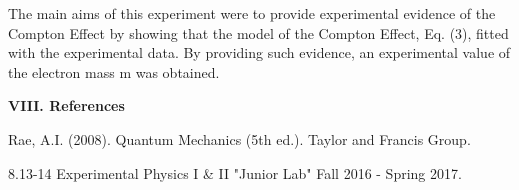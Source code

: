 \documentclass[fleqn]{article}
\begin{document}
  \vspace{10px}

  The main aims of this experiment were to provide experimental evidence of the Compton Effect by showing that the model of the Compton Effect,
  Eq. (3), fitted with the experimental data. By providing such evidence, an experimental value of the electron mass m was obtained.

  \pagebreak

  \textbf{VIII. References}

  \vspace{15px}

  Rae, A.I. (2008). Quantum Mechanics (5th ed.). Taylor and Francis Group.

  \vspace{5px}

  8.13-14 Experimental Physics I \& II "Junior Lab" Fall 2016 - Spring 2017.
\end{document}
